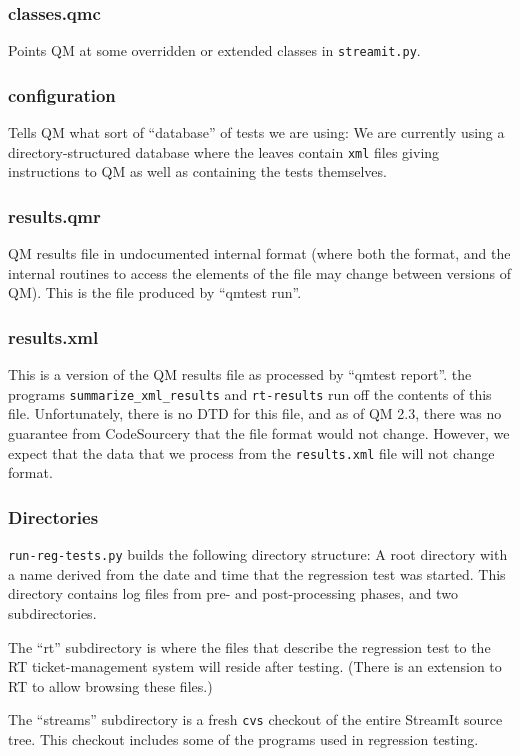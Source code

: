 \documentclass[11pt]{article}
\begin{document}
\subsubsection{classes.qmc}
Points QM at some overridden or extended classes in {\tt streamit.py}.

\subsubsection{configuration}
Tells QM what sort of ``database'' of tests we are using:  We are currently
using a directory-structured database where the leaves contain {\tt  xml} 
files giving instructions to QM as well as containing the tests themselves.

\subsubsection{results.qmr}
QM results file in undocumented internal format (where both the
format, and the internal routines to access the elements of the file
may change between versions of QM).  This is the file produced by
``qmtest run''.

\subsubsection{results.xml}
This is a version of the QM results file as processed by ``qmtest report''.
the programs {\tt summarize_xml_results} and {\tt rt-results} run off
the contents of this file.
Unfortunately, there is no DTD for this file, and as of QM 2.3, there
was no guarantee from CodeSourcery that the file format would not
change.
However, we expect that the data that we process from the {\tt results.xml}
file will not change format.

\subsubsection{Directories}
{\tt run-reg-tests.py} builds the following directory structure:
A root directory with a name derived from the date and time that the
regression test was started.
This directory contains log files from pre- and post-processing
phases, and two subdirectories.

The ``rt'' subdirectory is where the files that describe the
regression test to the RT ticket-management system will reside after
testing. (There is an extension to RT to allow browsing these files.)

The ``streams'' subdirectory is a fresh {\tt cvs} checkout of the
entire StreamIt source tree.  This checkout includes some of the
programs used in regression testing.
\end{document}
